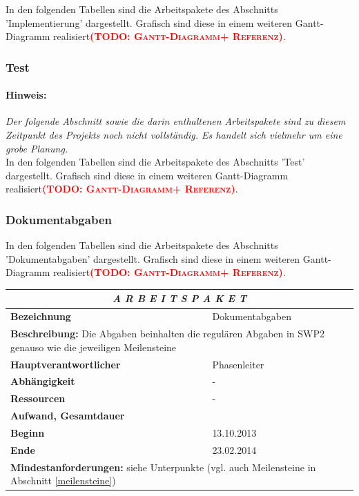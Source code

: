 \documentclass[fontsize=12pt,paper=a4,twoside]{scrartcl}
\newcommand{\todo}[1]{\textbf{\textsc{\textcolor{red}{(TODO: #1)}}}}
\begin{document}
In den folgenden Tabellen sind die Arbeitspakete des Abschnitts 'Implementierung' dargestellt. Grafisch sind diese in einem weiteren Gantt-Diagramm realisiert\todo{Gantt-Diagramm+ Referenz}.

\subsubsection{Test}\label{aps}

\paragraph{Hinweis:} \textit{Der folgende Abschnitt sowie die darin enthaltenen Arbeitspakete sind zu diesem Zeitpunkt des Projekts noch nicht vollständig. Es handelt sich vielmehr um eine grobe Planung.}\\

In den folgenden Tabellen sind die Arbeitspakete des Abschnitts 'Test' dargestellt. Grafisch sind diese in einem weiteren Gantt-Diagramm realisiert\todo{Gantt-Diagramm+ Referenz}.


\subsubsection{Dokumentabgaben}\label{aps}

In den folgenden Tabellen sind die Arbeitspakete des Abschnitts 'Dokumentabgaben' dargestellt. Grafisch sind diese in einem weiteren Gantt-Diagramm realisiert\todo{Gantt-Diagramm+ Referenz}.

\begin{tabular}{p{7.5cm}|p{7.5cm}}\toprule
\multicolumn{2}{c}{\textbf{\textit{A R B E I T S P A K E T \quad 6}}} \\ \toprule \hline
\textbf{Bezeichnung} & Dokumentabgaben\\\hline
\multicolumn{2}{p{15cm}}{\textbf{Beschreibung:} \newline 
Die Abgaben beinhalten die regulären Abgaben in SWP2 genauso wie die jeweiligen Meilensteine}  \\\hline
\textbf{Hauptverantwortlicher} & Phasenleiter \\\hline
\textbf{Abhängigkeit} & -\\\hline
\textbf{Ressourcen} & -\\\hline
\textbf{Aufwand, Gesamtdauer} & \\\hline
\textbf{Beginn} & 13.10.2013 \\\hline
\textbf{Ende} & 23.02.2014\\\hline
\multicolumn{2}{p{15cm}}{\textbf{Mindestanforderungen: } \newline
siehe Unterpunkte (vgl. auch Meilensteine in Abschnitt \ref{meilensteine})}  \\ \toprule
\end{tabular} \\\\
\end{document}
